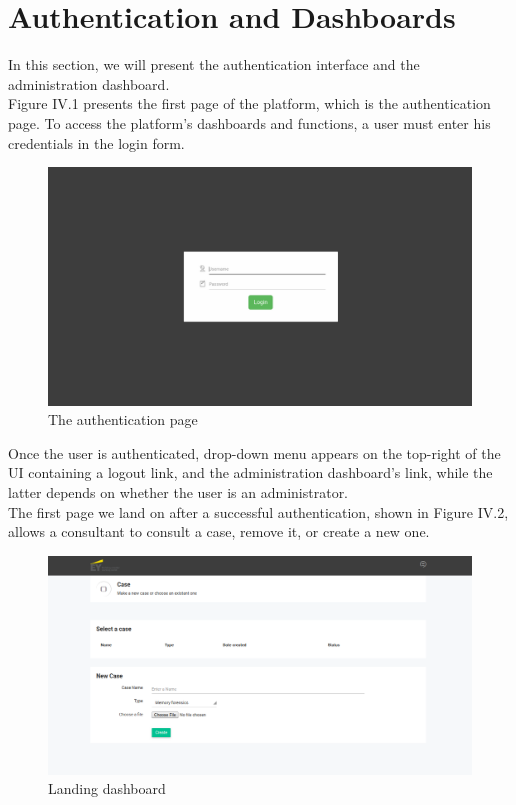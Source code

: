 \section{Authentication and Dashboards}
In this section, we will present the authentication interface and the administration dashboard.\\
Figure IV.1 presents the first page of the platform, which is the authentication page. To access the platform's dashboards and functions, a user must enter his credentials in the login form.
\begin{figure}[H]
\centering
\includegraphics[width=0.9\columnwidth]{Figures/1.png}
\caption{The authentication page}
\end{figure}
Once the user is authenticated, drop-down menu appears on the top-right of the UI containing a logout link, and the administration dashboard's link, while the latter depends on whether the user is an administrator.\\
The first page we land on after a successful authentication, shown in Figure IV.2, allows a consultant to consult a case, remove it, or create a new one.
\begin{figure}[H]
\centering
\includegraphics[width=0.9\columnwidth]{Figures/2.png}
\caption{Landing dashboard}
\end{figure}
